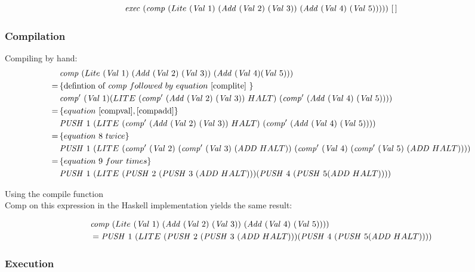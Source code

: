 \documentclass {article}
\begin{document}
\[ \Exec (\Comp (Lite\ (\Val 1)\
		 (\Add (\Val 2)\ (\Val 3))\ 
		(\Add (\Val 4)\ (\Val 5)))))\ [\, ] \]

\subsubsection{Compilation}

Compiling by hand:
\begin{align*}	
&\Comp (Lite\ (\Val 1)\ (\Add (\Val 2)\ (\Val 3))\ (\Add (\Val 4) (\Val 5))) \\
=\, & \{ \mbox{defintion of}\ \Comp followed\ by\ equation\ \ref{complite}\ \} \\
&\Compp  (\Val 1) (LITE\ (\Compp  (\Add (\Val 2)\ (\Val 3))\ HALT)\ (\Compp   (\Add (\Val 4)\ (\Val 5)))) \\
=\, & \{ equation\ \ref{compval}, \ref{compadd} \} \\
&\PUSH 1\ (LITE\ (\Compp  (\Add (\Val 2)\ (\Val 3))\ HALT)\ (\Compp  (\Add (\Val 4)\ (\Val 5)))) \\
=\, & \{ equation\ 8\ twice \} \\
&\PUSH 1\ (LITE\ (\Compp  (\Val 2)\ (\Compp  (\Val 3)\ (\ADD  HALT))\ (\Compp   (\Val 4)\ (\Compp  (\Val 5)\ (\ADD  HALT)))) \\
=\, & \{ equation\ 9\ four\ times \} \\
&\PUSH 1\ (LITE\ (\PUSH 2\ (\PUSH 3\ (\ADD  HALT))) (\PUSH 4\ (\PUSH 5 (\ADD  HALT))))
\end{align*}

Using the compile function \\Comp on this expression 
in the Haskell implementation yields the same result:

\begin{align*}	
&\Comp (Lite\ (\Val 1)\
		 (\Add (\Val 2)\ (\Val 3))\ 
		(\Add (\Val 4)\ (\Val 5)))) \\
&= \PUSH 1\ (LITE\ 
		(\PUSH 2\ (\PUSH 3\ 
		(\ADD  HALT))) 
		(\PUSH 4\ (\PUSH 5 (\ADD  HALT))))
\end{align*}

\subsubsection{Execution}

\end{document}
